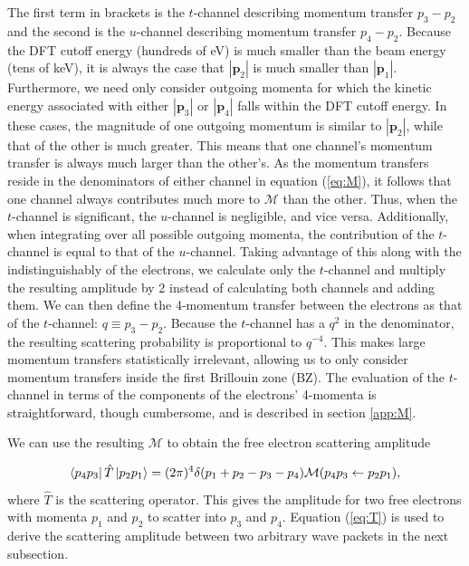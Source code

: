 \documentclass[twoside,twocolumn,9pt]{article}
\begin{document}
The first term in brackets is the $t$-channel describing momentum transfer $p_3
- p_2$ and the second is the $u$-channel describing momentum transfer $p_4 -
p_2$.
Because the DFT cutoff energy (hundreds of eV) is much smaller than the beam
energy (tens of keV), it is always the case that $|\mathbf{p}_2|$ is much
smaller than $|\mathbf{p}_1|$.
Furthermore, we need only consider outgoing momenta for which the kinetic
energy associated with either $|\mathbf{p}_3|$ or $|\mathbf{p}_4|$ falls within
the DFT cutoff energy.
In these cases, the magnitude of one outgoing momentum is similar to
$|\mathbf{p}_2|$, while that of the other is much greater.
This means that one channel's momentum transfer is always much larger than the
other's.
As the momentum transfers reside in the denominators of either channel in
equation (\ref{eq:M}), it follows that one channel always contributes much more
to $\mathcal{M}$ than the other.
Thus, when the $t$-channel is significant, the $u$-channel is negligible, and
vice versa.
Additionally, when integrating over all possible outgoing momenta, the
contribution of the $t$-channel is equal to that of the $u$-channel.
Taking advantage of this along with the indistinguishably of the electrons, we
calculate only the $t$-channel and multiply the resulting amplitude by 2
instead of calculating both channels and adding them.
We can then define the 4-momentum transfer between the electrons as that of the
$t$-channel: $q\equiv p_3 - p_2$.
Because the $t$-channel has a $q^2$ in the denominator, the resulting
scattering probability is proportional to $q^{-4}$.
This makes large momentum transfers statistically irrelevant, allowing us to
only consider momentum transfers inside the first Brillouin zone (BZ).
The evaluation of the $t$-channel in terms of the
components of the electrons' 4-momenta is straightforward, though cumbersome,
and is described in section \ref{app:M}.

We can use the resulting $\mathcal{M}$ to obtain the free electron scattering
amplitude

\begin{equation} 
  \label{eq:T} 
  \bra{p_4 p_3}\hat{T}\ket{p_2p_1} 
  = 
  (2\pi)^4\delta(p_1 + p_2 - p_3 - p_4) 
  \mathcal{M}(p_4p_3\leftarrow p_2p_1),
\end{equation}
%
where $\hat{T}$ is the scattering operator.\cite{Peskin1995, Lancaster2014}
This gives the amplitude for two free electrons with momenta $p_1$ and $p_2$ to
scatter into $p_3$ and $p_4$.
Equation (\ref{eq:T}) is used to derive the scattering amplitude between two
arbitrary wave packets in the next subsection.
\end{document}
